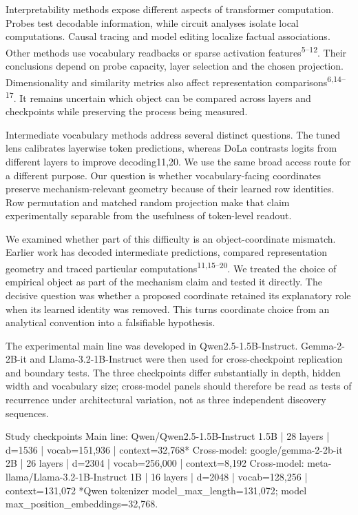 \documentclass[11pt]{article}
\begin{document}
Interpretability methods expose different aspects of transformer computation. Probes test decodable information, while circuit analyses isolate local computations. Causal tracing and model editing localize factual associations. Other methods use vocabulary readbacks or sparse activation features\textsuperscript{5--12}. Their conclusions depend on probe capacity, layer selection and the chosen projection. Dimensionality and similarity metrics also affect representation comparisons\textsuperscript{6,14--17}. It remains uncertain which object can be compared across layers and checkpoints while preserving the process being measured.

Intermediate vocabulary methods address several distinct questions. The tuned lens calibrates layerwise token predictions, whereas DoLa contrasts logits from different layers to improve decoding11,20. We use the same broad access route for a different purpose. Our question is whether vocabulary-facing coordinates preserve mechanism-relevant geometry because of their learned row identities. Row permutation and matched random projection make that claim experimentally separable from the usefulness of token-level readout.

We examined whether part of this difficulty is an object-coordinate mismatch. Earlier work has decoded intermediate predictions, compared representation geometry and traced particular computations\textsuperscript{11,15--20}. We treated the choice of empirical object as part of the mechanism claim and tested it directly. The decisive question was whether a proposed coordinate retained its explanatory role when its learned identity was removed. This turns coordinate choice from an analytical convention into a falsifiable hypothesis.

The experimental main line was developed in Qwen2.5-1.5B-Instruct. Gemma-2-2B-it and Llama-3.2-1B-Instruct were then used for cross-checkpoint replication and boundary tests. The three checkpoints differ substantially in depth, hidden width and vocabulary size; cross-model panels should therefore be read as tests of recurrence under architectural variation, not as three independent discovery sequences.

\begin{CodeBlock}

Study checkpoints
Main line:   Qwen/Qwen2.5-1.5B-Instruct
             1.5B | 28 layers | d=1536 | vocab=151,936 | context=32,768*
Cross-model: google/gemma-2-2b-it
             2B | 26 layers | d=2304 | vocab=256,000 | context=8,192
Cross-model: meta-llama/Llama-3.2-1B-Instruct
             1B | 16 layers | d=2048 | vocab=128,256 | context=131,072
*Qwen tokenizer model_max_length=131,072; model max_position_embeddings=32,768.
\end{CodeBlock}
\end{document}
